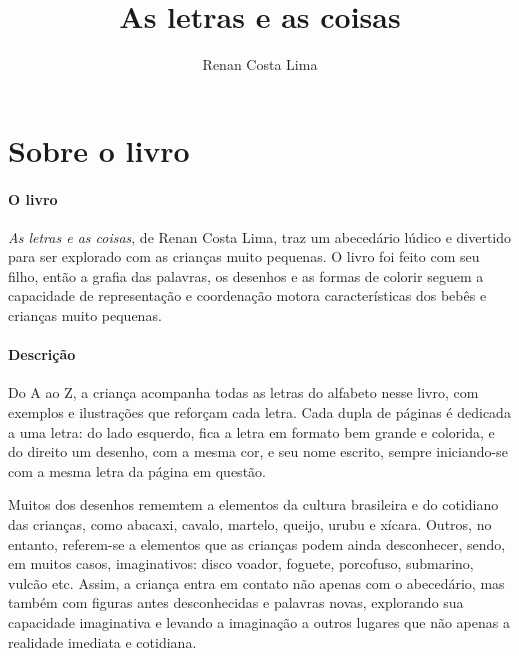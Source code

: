 \documentclass[11pt]{extarticle}
\newcommand{\AutorLivro}{Renan Costa Lima}
\newcommand{\TituloLivro}{As letras e as coisas}
\newcommand{\colaborador}{Paulo Pompermaier e Renier Silva}
\begin{document}
\title{\TituloLivro}
\author{\AutorLivro}
\def\authornotes{\colaborador}

\date{}
\maketitle


\tableofcontents



\section{Sobre o livro}

\paragraph{O livro} \textit{As letras e as coisas}, de Renan Costa Lima, traz um abecedário lúdico e divertido para ser explorado com as crianças muito pequenas. O livro foi feito com seu filho, então a grafia das palavras, os desenhos e as formas de colorir seguem a capacidade de representação e coordenação motora características dos bebês e crianças muito pequenas.

\paragraph{Descrição} Do A ao Z, a criança acompanha todas as letras do alfabeto nesse livro, com exemplos e ilustrações que reforçam cada letra. Cada dupla de páginas é dedicada a uma letra: do lado esquerdo, fica a letra em formato bem grande e colorida, e do direito um desenho, com a mesma cor, e seu nome escrito, sempre iniciando-se com a mesma letra da página em questão.

Muitos dos desenhos rememtem a elementos da cultura brasileira e do cotidiano das crianças, como abacaxi, cavalo, martelo, queijo, urubu e xícara. Outros, no entanto, referem-se a elementos que as crianças podem ainda desconhecer, sendo, em muitos casos, imaginativos: disco voador, foguete, porcofuso, submarino, vulcão etc. Assim, a criança entra em contato não apenas com o abecedário, mas também com figuras antes desconhecidas e palavras novas, explorando sua capacidade imaginativa e levando a imaginação a outros lugares que não apenas a realidade imediata e cotidiana.
\end{document}
